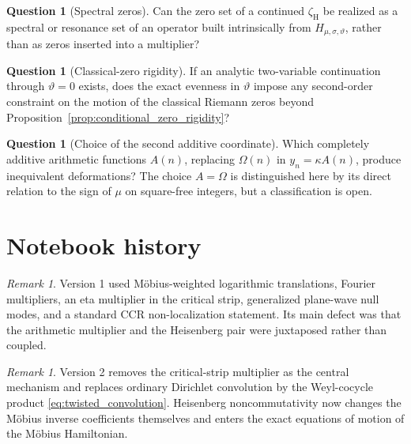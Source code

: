 \documentclass[11pt]{amsart}
\numberwithin{equation}{section}
\theoremstyle{plain}
\theoremstyle{definition}
\newtheorem{question}[theorem]{Question}
\theoremstyle{remark}
\newtheorem{remark}[theorem]{Remark}
\newcommand{\Om}{\Omega}
\begin{document}
\begin{question}[Spectral zeros]
\label{q:spectral_zeros}
Can the zero set of a continued $\zeta_{\mathrm H}$ be realized as a spectral
or resonance set of an operator built intrinsically from
$H_{\mu,\sigma,\vartheta}$, rather than as zeros inserted into a multiplier?
\end{question}

\begin{question}[Classical-zero rigidity]
\label{q:classical_zero_rigidity}
If an analytic two-variable continuation through $\vartheta=0$ exists, does
the exact evenness in $\vartheta$ impose any second-order constraint on the
motion of the classical Riemann zeros beyond
Proposition~\ref{prop:conditional_zero_rigidity}?
\end{question}

\begin{question}[Choice of the second additive coordinate]
\label{q:additive_coordinate}
Which completely additive arithmetic functions $A(n)$, replacing $\Om(n)$
in $y_n=\kappa A(n)$, produce inequivalent deformations?  The choice
$A=\Om$ is distinguished here by its direct relation to the sign of $\mu$ on
square-free integers, but a classification is open.
\end{question}

\section{Notebook history}
\label{sec:notebook_history}

\begin{remark}
\label{rem:history_v1}
Version 1 used M\"obius-weighted logarithmic translations, Fourier
multipliers, an eta multiplier in the critical strip, generalized plane-wave
null modes, and a standard CCR non-localization statement.  Its main defect
was that the arithmetic multiplier and the Heisenberg pair were juxtaposed
rather than coupled.
\end{remark}

\begin{remark}
\label{rem:history_v2}
Version 2 removes the critical-strip multiplier as the central mechanism and
replaces ordinary Dirichlet convolution by the Weyl-cocycle product
\eqref{eq:twisted_convolution}.  Heisenberg noncommutativity now changes the
M\"obius inverse coefficients themselves and enters the exact equations of
motion of the M\"obius Hamiltonian.
\end{remark}
\end{document}
